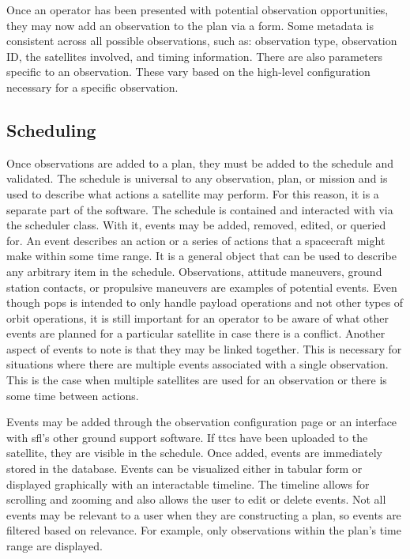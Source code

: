 Once an operator has been presented with potential observation opportunities,
they may now add an observation to the plan via a form. Some metadata is
consistent across all possible observations, such as: observation type,
observation ID, the satellites involved, and timing information. There are also
parameters specific to an observation. These vary based on the high-level
configuration necessary for a specific observation. 


\subsection{Scheduling}


Once observations are added to a plan, they must be added to the schedule and
validated. The schedule is universal to any observation, plan, or mission and
is used to describe what actions a satellite may perform. For this reason, it
is a separate part of the software. The schedule is contained and interacted
with via the scheduler class. With it, events may be added, removed, edited, or
queried for. An event describes an action or a series of actions that a
spacecraft might make within some time range. It is a general object that can
be used to describe any arbitrary item in the schedule. Observations, attitude
maneuvers, ground station contacts, or propulsive maneuvers are examples of
potential events. Even though \gls{pops} is intended to only handle payload
operations and not other types of orbit operations, it is still important for
an operator to be aware of what other events are planned for a particular
satellite in case there is a conflict. Another aspect of events to note is that
they may be linked together. This is necessary for situations where there are
multiple events associated with a single observation. This is the case when
multiple satellites are used for an observation or there is some time between
actions.  

Events may be added through the observation configuration page or an interface
with \gls{sfl}’s other ground support software. If \glspl{ttc} have been
uploaded to the satellite, they are visible in the schedule. Once added, events
are immediately stored in the database. Events can be visualized either in
tabular form or displayed graphically with an interactable timeline. The
timeline allows for scrolling and zooming and also allows the user to edit or
delete events. Not all events may be relevant to a user when they are
constructing a plan, so events are filtered based on relevance. For example,
only observations within the plan’s time range are displayed.

